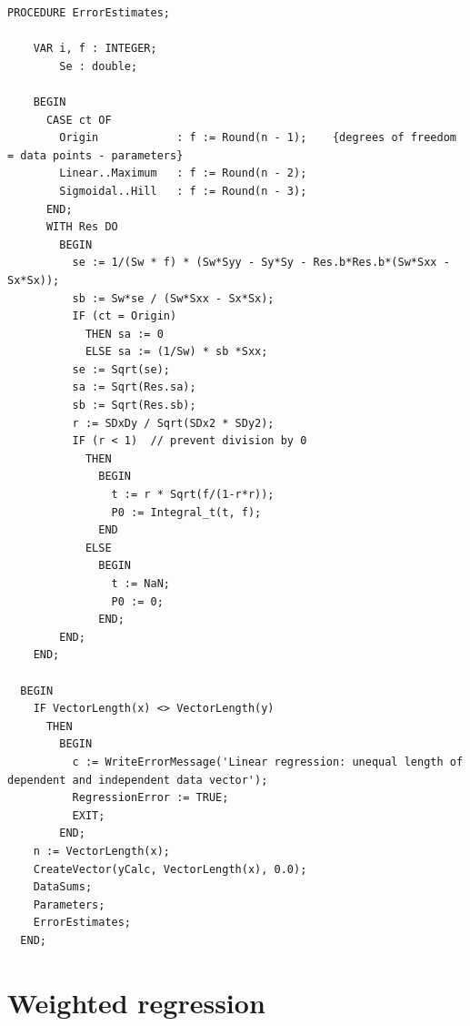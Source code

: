 \begin{refsection}
\begin{lstlisting}[caption=Linear regression by RSS]
    PROCEDURE ErrorEstimates;

    VAR i, f : INTEGER;
        Se : double;

    BEGIN
      CASE ct OF
        Origin            : f := Round(n - 1);    {degrees of freedom = data points - parameters}
        Linear..Maximum   : f := Round(n - 2);
        Sigmoidal..Hill   : f := Round(n - 3);
      END;
      WITH Res DO
        BEGIN
          se := 1/(Sw * f) * (Sw*Syy - Sy*Sy - Res.b*Res.b*(Sw*Sxx - Sx*Sx));
          sb := Sw*se / (Sw*Sxx - Sx*Sx);
          IF (ct = Origin)
            THEN sa := 0
            ELSE sa := (1/Sw) * sb *Sxx;
          se := Sqrt(se);
          sa := Sqrt(Res.sa);
          sb := Sqrt(Res.sb);
          r := SDxDy / Sqrt(SDx2 * SDy2);
          IF (r < 1)  // prevent division by 0
            THEN
              BEGIN
                t := r * Sqrt(f/(1-r*r));
                P0 := Integral_t(t, f);
              END
            ELSE
              BEGIN
                t := NaN;
                P0 := 0;
              END;
        END;
    END;

  BEGIN
    IF VectorLength(x) <> VectorLength(y)
      THEN
        BEGIN
          c := WriteErrorMessage('Linear regression: unequal length of dependent and independent data vector');
          RegressionError := TRUE;
          EXIT;
        END;
    n := VectorLength(x);
    CreateVector(yCalc, VectorLength(x), 0.0);
    DataSums;
    Parameters;
    ErrorEstimates;
  END;
\end{lstlisting}

\section{Weighted regression}


\end{refsection}
